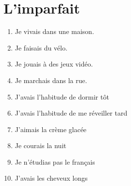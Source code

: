 \section*{L'imparfait}

\begin{enumerate}
    \item Je vivais dans une maison.              %
    \item Je faisais du vélo.                     %
    \item Je jouais à des jeux vidéo.             %
    \item Je marchais dans la rue.                %
    \item J'avais l'habitude de dormir tôt        %
    \item J'avais l'habitude de me réveiller tard %
    \item J'aimais la crème glacée                %
    \item Je courais la nuit                      %
    \item Je n'étudias pas le français            %
    \item J'avais les cheveux longs               %
\end{enumerate}

